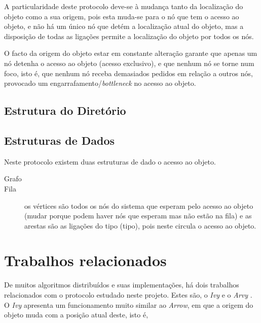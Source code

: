  

A particularidade deste protocolo deve-se à mudança tanto da localização do objeto como a sua origem, pois esta muda-se para o nó que tem o acesso ao objeto, e não há um único nó que detém a localização atual do objeto, mas a disposição de todas as ligações permite a localização do objeto por todos os nós.

O facto da origem do objeto estar em constante alteração garante que apenas um nó detenha o acesso ao objeto (acesso exclusivo), e que nenhum nó se torne num foco, isto é, que nenhum nó receba demasiados pedidos em relação a outros nós, provocado um engarrafamento/\emph{bottleneck} no acesso ao objeto.


\subsection{Estrutura do Diretório}

\subsection{Estruturas de Dados}
Neste protocolo existem duas estruturas de dado o acesso ao objeto.

\begin{description}
    \item [Grafo] 
    \item [Fila] os vértices são todos os nós do sistema que esperam pelo acesso ao objeto (mudar porque podem haver nós que esperam mas não estão na fila) e as arestas são as ligações do tipo (tipo), pois neste circula o acesso ao objeto.
\end{description}

\section{Trabalhos relacionados}
De muitos algoritmos distribuídos e suas implementações, há dois trabalhos relacionados com o protocolo estudado neste projeto. Estes são, o \emph{Ivy} \cite{Ivy} e o \emph{Arvy} \cite{Arvy}.
O \emph{Ivy} apresenta um funcionamento muito similar ao \emph{Arrow}, em que a origem do objeto muda com a posição atual deste, isto é, 



